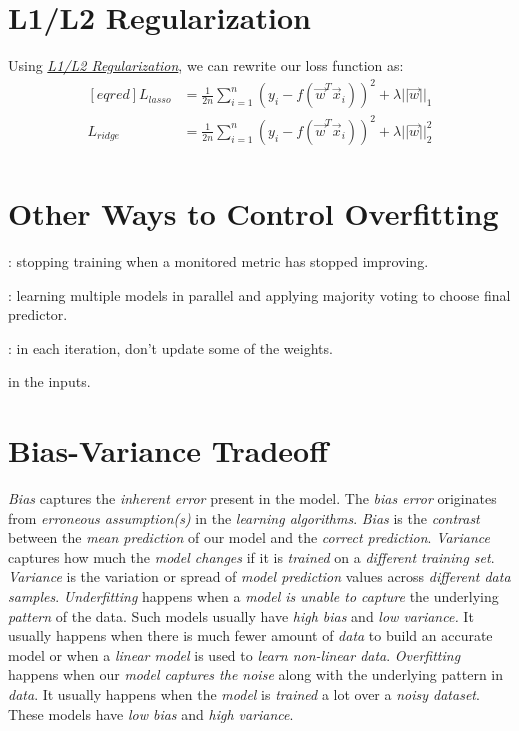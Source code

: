 \documentclass[
	exam={Midterm}
]{cs584exam}
\begin{document}
\section{L1/L2 Regularization}\label{sec:l1/l2-regularization}
Using \emph{\hyperref[sec:regularization]{L1/L2 Regularization}}, we can rewrite our loss function as:
\begin{equation*}
\begin{aligned}[eqred]
	L_{lasso} &= \frac{1}{2n}\sum_{i=1}^{n} \left( y_{i} - f(\vec{w}^{T}\vec{x}_{i}) \right)^{2} + \lambda ||\vec{w}||_{1}\\
	L_{ridge} &= \frac{1}{2n}\sum_{i=1}^{n} \left( y_{i} - f(\vec{w}^{T}\vec{x}_{i}) \right)^{2} + \lambda ||\vec{w}||_{2}^{2}\\
\end{aligned}
\end{equation*}

\section{Other Ways to Control Overfitting}\label{sec:other-ways-to-control-overfitting}
\begin{description}[font=\emph]
	\item[Early-stopping]: stopping training when a monitored metric has stopped improving.
	\item[Bagging]: learning multiple models in parallel and applying majority voting to choose final predictor.
	\item[Dropout]: in each iteration, don't update some of the weights.
	\item[Injecting noise] in the inputs.
\end{description}

\section{Bias-Variance Tradeoff}\label{sec:bias-variance-tradeoff}
\emph{Bias} captures the \emph{inherent error} present in the model.
The \emph{bias error} originates from \emph{erroneous assumption(s)} in the \emph{learning algorithms}.
\emph{Bias} is the \emph{contrast} between the \emph{mean prediction} of our model and the \emph{correct prediction}.
\emph{Variance} captures how much the \emph{model changes} if it is \emph{trained} on a \emph{different training set}.
\emph{Variance} is the variation or spread of \emph{model prediction} values across \emph{different data samples}.
\emph{Underfitting} happens when a \emph{model is unable to capture} the underlying \emph{pattern} of the data.
Such models usually have \emph{high bias} and \emph{low variance.}
It usually happens when there is much fewer amount of \emph{data} to build an accurate model or when a \emph{linear model} is used to \emph{learn non-linear data}.
\emph{Overfitting} happens when our \emph{model captures the noise} along with the underlying pattern in \emph{data}.
It usually happens when the \emph{model} is \emph{trained} a lot over a \emph{noisy dataset}.
These models have \emph{low bias} and \emph{high variance}.
\end{document}
